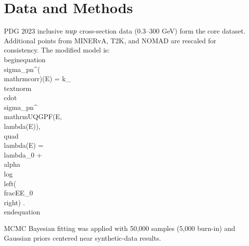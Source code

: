 \documentclass[aps,prd,reprint,superscriptaddress,showpacs,nofootinbib]{revtex4-2}
\begin{document}
\section{Data and Methods}
PDG 2023 inclusive $\\nu p$ cross-section data ($0.3$--$300$ GeV) form the core dataset. Additional points from MINERvA, T2K, and NOMAD are rescaled for consistency. The modified model is:
\\begin{equation}
    \\sigma_{pn}^{(\\mathrm{corr})}(E) = k_{\\text{norm}} \\cdot \\sigma_{pn}^{\\mathrm{UQGPF}}(E, \\lambda(E)), \\quad 
    \\lambda(E) = \\lambda_0 + \\alpha \\log \\left( \\frac{E}{E_0} \\right) .
\\end{equation}

MCMC Bayesian fitting was applied with 50,000 samples (5,000 burn-in) and Gaussian priors centered near synthetic-data results.
\end{document}

